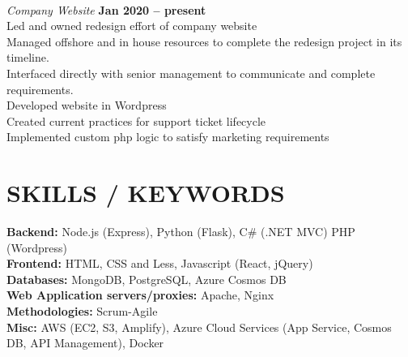 \documentclass[margin,line]{resume}
\begin{document}
\begin{resume}
    \textbf{\listing} \vspace{0mm}\\\vspace{1mm}%
    \textsl{Company Website} \hfill \textbf{Jan 2020 -- present}\\
    Led and owned redesign effort of company website\\
    Managed offshore and in house resources to complete the redesign project in its timeline.\\
    Interfaced directly with senior management to communicate and complete requirements.\\
    Developed website in Wordpress\\
    Created current practices for support ticket lifecycle\\
    Implemented custom php logic to satisfy marketing requirements\\

\sectionline

\section{\mysidestyle \textbf{\large{S}\small{KILLS} / \large{K}\small{EYWORDS}}}

    \textbf{Backend:} Node.js (Express), Python (Flask), C\# (.NET MVC) PHP (Wordpress)\\
    \textbf{Frontend:} HTML, CSS and Less, Javascript (React, jQuery)\\
    \textbf{Databases:} MongoDB, PostgreSQL, Azure Cosmos DB\\
    \textbf{Web Application servers/proxies:} Apache, Nginx\\
    \textbf{Methodologies:} Scrum-Agile\\
    \textbf{Misc:} AWS (EC2, S3, Amplify), Azure Cloud Services (App Service, Cosmos DB, API Management), Docker\\


\sectionline



\end{resume}
\end{document}
